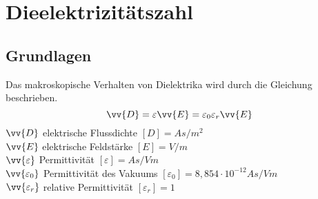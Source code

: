 \documentclass[a4paper,twoside,12pt,DIV=13,BCOR=5mm,numbers=noenddot,cleardoublepage=empty]{scrbook}
\begin{document}
    \chapter{Dieelektrizit\"atszahl}
    \section{Grundlagen}
    Das makroskopische Verhalten von Dielektrika wird durch die Gleichung beschrieben.
    \begin{equation}
    \vv{D}=\varepsilon\vv{E}=\varepsilon_{0}\varepsilon_{r}\vv{E}
    \end{equation}
    $\vv{D}$ elektrische Flussdichte $[D]=As/m^{2}$ \\
    $\vv{E}$ elektrische Feldst\"arke $[E]=V/m$ \\
    $\vv{\varepsilon}$ Permittivit\"at $[\varepsilon]=As/Vm$ \\
    $\vv{\varepsilon_{0}}$ Permittivit\"at des Vakuums $[\varepsilon_{0}]=8,854\cdot10^{-12} As/Vm$ \\
    $\vv{\varepsilon_{r}}$ relative Permittivit\"at $[\varepsilon_{r}]=1$ \\
    
\end{document}
